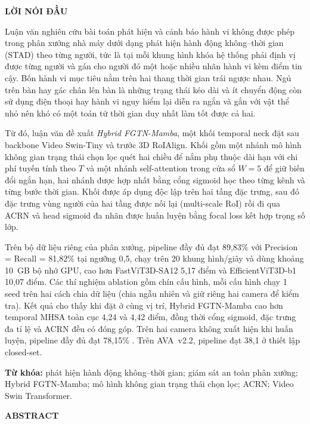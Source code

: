 \newpage
\begin{center}
  \textbf{\large LỜI NÓI ĐẦU}
\end{center}

Luận văn nghiên cứu bài toán phát hiện và cảnh báo hành vi không được phép trong phân xưởng nhà máy dưới dạng phát hiện hành động không--thời gian (STAD) theo từng người, tức là tại mỗi khung hình khóa hệ thống phải định vị được từng người và gán cho người đó một hoặc nhiều nhãn hành vi kèm điểm tin cậy. Bốn hành vi mục tiêu nằm trên hai thang thời gian trái ngược nhau. Ngủ trên bàn hay gác chân lên bàn là những trạng thái kéo dài và ít chuyển động còn sử dụng điện thoại hay hành vi nguy hiểm lại diễn ra ngắn và gắn với vật thể nhỏ nên khó có một toán tử thời gian duy nhất làm tốt được cả hai.

Từ đó, luận văn đề xuất \emph{Hybrid FGTN-Mamba}, một khối temporal neck đặt sau backbone Video Swin-Tiny và trước 3D RoIAlign. Khối gồm một nhánh mô hình không gian trạng thái chọn lọc quét hai chiều để nắm phụ thuộc dài hạn với chi phí tuyến tính theo $T$ và một nhánh self-attention trong cửa sổ $W=5$ để giữ biến đổi ngắn hạn, hai nhánh được hợp nhất bằng cổng sigmoid học theo từng kênh và từng bước thời gian. Khối được áp dụng độc lập trên hai tầng đặc trưng, sau đó đặc trưng vùng người của hai tầng được nối lại (multi-scale RoI) rồi đi qua ACRN và head sigmoid đa nhãn được huấn luyện bằng focal loss kết hợp trọng số lớp.

Trên bộ dữ liệu riêng của phân xưởng, pipeline đầy đủ đạt 89,83\% \mAP{} với Precision = Recall = 81,82\% tại ngưỡng 0,5, chạy trên 20 khung hình/giây và dùng khoảng 10~GB bộ nhớ GPU, cao hơn FastViT3D-SA12 5,17 điểm và EfficientViT3D-b1 10,07 điểm. Các thí nghiệm ablation gồm chín cấu hình, mỗi cấu hình chạy 1 seed trên hai cách chia dữ liệu (chia ngẫu nhiên và giữ riêng hai camera để kiểm tra). Kết quả cho thấy khi đặt ở cùng vị trí, Hybrid FGTN-Mamba cao hơn temporal MHSA toàn cục 4,24 và 4,42 điểm, đồng thời cổng sigmoid, đặc trưng đa tỉ lệ và ACRN đều có đóng góp. Trên hai camera không xuất hiện khi huấn luyện, pipeline đầy đủ đạt 78,15\% \mAP{}. Trên AVA~v2.2, pipeline đạt 38,1 \mAP{} ở thiết lập closed-set.

\textbf{Từ khóa:} phát hiện hành động không--thời gian; giám sát an toàn phân xưởng; Hybrid FGTN-Mamba; mô hình không gian trạng thái chọn lọc; ACRN; Video Swin Transformer.

\clearpage
\newpage
\begin{center}
  \textbf{\large ABSTRACT}
\end{center}


